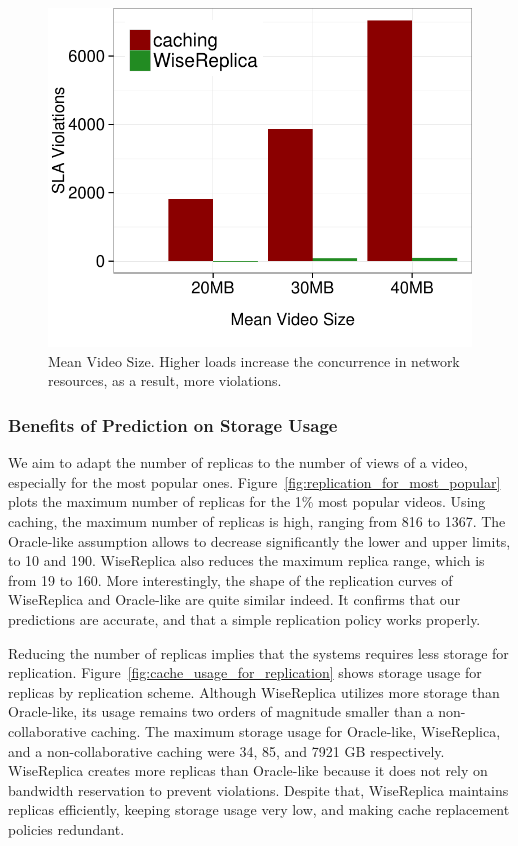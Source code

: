 \begin{figure}
  \centering
     \includegraphics[width=.5\textwidth]{inputs/img/mean_load_bar}
  \caption{Mean Video Size. Higher loads increase the concurrence in network resources, as a result, more violations.}
  \label{fig:mean_load_bar}
\end{figure}

\subsubsection{Benefits of Prediction on Storage Usage}

We aim to adapt the number of replicas to the number of views of a video, especially for the most popular ones. Figure~\ref{fig:replication_for_most_popular} plots the maximum number of replicas for the 1\% most popular videos. Using caching, the maximum number of replicas is high, ranging from 816 to 1367. The Oracle-like assumption allows to decrease significantly the lower and upper limits, to 10 and 190. WiseReplica also reduces the maximum replica range, which is from 19 to 160. More interestingly, the shape of the replication curves of WiseReplica and Oracle-like are quite similar indeed. It confirms that our predictions are accurate, and that a simple replication policy works properly.

Reducing the number of replicas implies that the systems requires less storage for replication. Figure~\ref{fig:cache_usage_for_replication} shows storage usage for replicas by replication scheme. Although WiseReplica utilizes more storage than Oracle-like, its usage remains two orders of magnitude smaller than a non-collaborative caching. The maximum storage usage for Oracle-like, WiseReplica, and a non-collaborative caching were 34, 85, and 7921 GB respectively. WiseReplica creates more replicas than Oracle-like because it does not rely on bandwidth reservation to prevent violations. Despite that, WiseReplica maintains replicas efficiently, keeping storage usage very low, and making cache replacement policies redundant.

